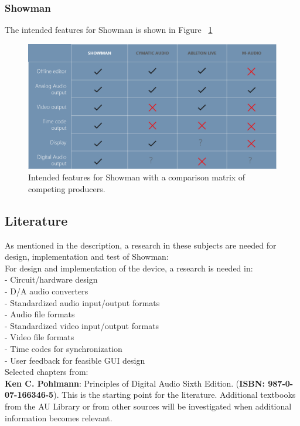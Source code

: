 \subsubsection{Showman}
The intended features for Showman is shown in Figure ~\ref{fig:showman.png}

\begin{figure}[H]
\centering
\includegraphics[scale=0.5]{./pictures/showman.png}
\caption{Intended features for Showman with a comparison matrix of competing producers.}
\label{fig:showman.png}
\end{figure}

\subsection{Literature}
As mentioned in the description, a research in these subjects are needed for design, implementation and test of Showman: \\

For design and implementation of the device, a research is needed in: \\
- Circuit/hardware design \\
- D/A audio converters \\
- Standardized audio input/output formats \\
- Audio file formats \\
- Standardized video input/output formats \\
- Video file formats \\
- Time codes for synchronization \\
- User feedback for feasible GUI design \\

Selected chapters from: \\
\textbf{Ken C. Pohlmann}: Principles of Digital Audio Sixth Edition. (\textbf{ISBN: 987-0-07-166346-5}). This is the starting point for the literature. Additional textbooks from the AU Library or from other sources will be investigated when additional information becomes relevant. \\


